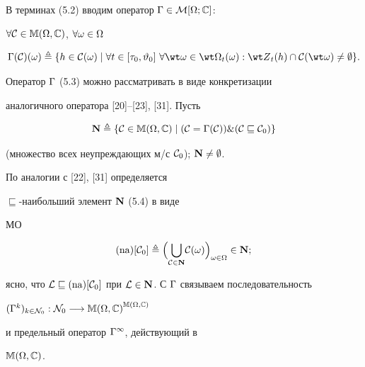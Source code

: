 В терминах (5.2) вводим оператор $\Gamma \in {\cal M}[\Omega;{\Bbb C}]$:


$\forall{\cal C} \in {\Bbb M}(\Omega,{\Bbb C})$, $\forall{\omega} \in \Omega$


\begin{equation}


{\Gm}({\cal C})(\omega) \stac \{h \in {{\cal C}(\omega)} \mid \fo{t} \in


[{{\tau}_0},{{\vt}_0}]\ \fo{\wt \omega} \in {{\wt \Om}_t}(\omega):


{{\wt Z}_t}(h) \cap {{\cal C}({\wt \omega})} \ne \emp\}.


\end{equation}


Оператор $\Gamma$ (5.3) можно рассматривать в виде конкретизации


аналогичного оператора [20]--[23], [31]. Пусть


\begin{equation}


{\bold N} \stac \{{\cal C} \in {\Bbb M}(\Om,{\Bbb C}) \mid ({\cal C} =


{\Gm}({\cal C})) \& ({\cal C} \sqsubseteq {{\cal C}_0})\}


\end{equation}


(множество всех неупреждающих м/с ${\cal C}_0$); ${\bold N} \ne \emptyset$.


По аналогии с [22], [31] определяется


$\sqsubseteq$-наибольший элемент ${\bold N}$ (5.4) в виде


МО


\begin{equation}


(\na)[{\cal C}_0] \stac \Big({\bigcup\limits_{{\cal C} \in


{\bold N}}}{{\cal C}(\omega)}\Big)_{\omega \in \Om} \in {\bold N};


\end{equation}


ясно, что ${\cal L} \sqsubseteq (\na)[{\cal C}_0]$ при ${\cal L} \in


{\bold N}$. С $\Gm$ связываем последовательность


${({\Gm}^k)_{k \in {{\cal N}_0}}}:{{\cal N}_0} \lo


{{\Bbb M}(\Om,{\Bbb C})}^{{\Bbb M}(\Om,{\Bbb C})}$


и предельный оператор ${{\Gamma}^\infty}$, действующий в


${\Bbb M}(\Omega,{\Bbb C})$.


